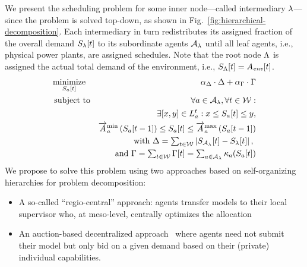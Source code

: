 \documentclass[conference]{IEEEtran}
\newcommand{\fref}[1]{Fig.~\ref{#1}}
\begin{document}
We present the scheduling problem for some inner node---called intermediary $\lambda$---since the problem is solved top-down, as shown in 
\fref{fig:hierarchical-decomposition}.
Each intermediary in turn redistributes its assigned fraction of the overall demand $S_{\lambda}[t]$ to 
its subordinate agents ${\mathcal{A}_{\lambda}}$ until all leaf agents, i.e., physical power plants, are assigned schedules. Note
that the root node $\Lambda$ is assigned the actual total demand of the environment, i.e., $S_{\Lambda}[t] = A_{\textit{env}}[t]$.
%
\begin{eqnarray}
\label{eq:csop-scheduling-hierarchy} \textstyle
		& \underset{\AgentPower{t}{\AnAgent}}{\operatorname{minimize}} & 
		\alpha_{\ViolationObjective} \cdot \ViolationObjective + \alpha_{\CostsObjective} \cdot \CostsObjective \\
		& \operatorname{subject\ to} & \forall a \in \Subsystem, \forall t \in \Horizon : \nonumber \\
		& & \exists [x , y] \in \ListProduction{t}\AnAgent : x \leq \AgentPower{t}{\AnAgent} \leq y\text{,} \nonumber \\
		& & \ChangeSpeedMin\AnAgent \left(\AgentPower{t-1}\AnAgent\right) \leq \AgentPower{t}{\AnAgent} \leq \ChangeSpeedMax\AnAgent\left(\AgentPower{t-1}\AnAgent\right) \nonumber\\
		& & \textstyle \text{with } \ViolationObjective = \sum_{t \in \Horizon} \left|\Production_\Subsystem[t] - \AssResidualLoad{t}{\AnAvpp} \right| \text{, } \nonumber \\
		& & \textstyle \text{and } 
		\CostsObjective = \sum_{t \in \Horizon} \CostsObjective[t] = \sum_{a \in \Subsystem} \CostFunction\AnAgent{\AgentPower{t}{\AnAgent}} \nonumber
\end{eqnarray}
%
We propose to solve this problem using two approaches based on self-organizing hierarchies
for problem decomposition:
\begin{itemize}
\item A so-called ``regio-central'' approach: agents transfer models to their local supervisor who, at meso-level,
centrally optimizes the allocation~\cite{Schiendorfer2014, SchiendorferSyn2014}
\item An auction-based decentralized approach~\cite{Anders-TAAS-2015} where agents need not submit their model
but only bid on a given demand based on their (private) individual capabilities.
\end{itemize}
\end{document}

